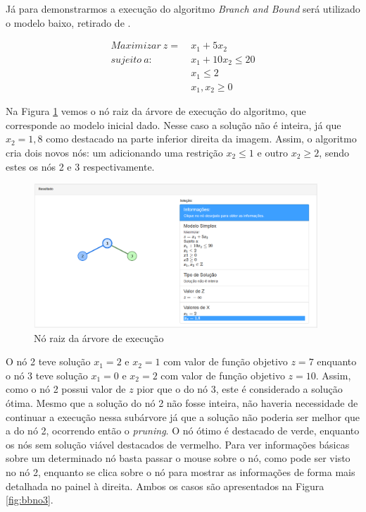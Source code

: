 \documentclass [11pt]{articleSBPO}
\begin{document}
Já para demonstrarmos a execução do algoritmo \textit{Branch and Bound} será utilizado o modelo baixo, retirado de \cite{hillier}.

\begin{equation*}
\begin{split}
Maximizar\ z =\ & x_{1} + 5x_{2} \\
sujeito\ a:\ \ \ \ &  x_{1} + 10x_{2} \leq 20 \\
& x_{1} \leq 2 \\
& x_{1}, x_{2} \geq 0
\end{split}
\end{equation*}

Na Figura \ref{fig:bbno1} vemos o nó raiz da árvore de execução do algoritmo, que corresponde ao modelo inicial dado. Nesse caso a solução não é inteira, já que $x_{2}=1,8$ como destacado na parte inferior direita da imagem. Assim, o algoritmo cria dois novos nós: um adicionando uma restrição $x_{2} \leq 1$ e outro $x_{2} \geq 2$, sendo estes os nós 2 e 3 respectivamente.

\begin{figure}[!h]
	\centering
	\includegraphics[width=0.95\textwidth]{img/bbno1.png}
	\caption[]{Nó raiz da árvore de execução}
	\label{fig:bbno1}
\end{figure}

O nó 2 teve solução $x_{1}=2$ e $x_{2}=1$ com valor de função objetivo $z = 7$ enquanto o nó 3 teve solução $x_{1}=0$ e $x_{2}=2$ com valor de função objetivo $z = 10$. Assim, como o nó 2 possui valor de $z$ pior que o do nó 3, este é considerado a solução ótima. Mesmo que a solução do nó 2 não fosse inteira, não haveria necessidade de continuar a execução nessa subárvore já que a solução não poderia ser melhor que a do nó 2, ocorrendo então o \textit{pruning}. O nó ótimo é destacado de verde, enquanto os nós sem solução viável destacados de vermelho. Para ver informações básicas sobre um determinado nó basta passar o mouse sobre o nó, como pode ser visto no nó 2, enquanto se clica sobre o nó para mostrar as informações de forma mais detalhada no painel à direita. Ambos os casos são apresentados na Figura \ref{fig:bbno3}.
\end{document}

